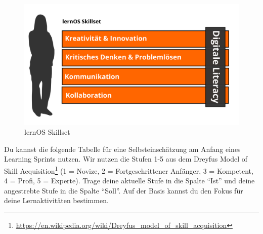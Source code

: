 \documentclass[
  ngerman,
  paper=a4,
,captions=tableheading
]{scrartcl}
\DeclareRobustCommand{\href}[2]{#2\footnote{\url{#1}}}
\begin{document}
\begin{figure}
\centering
\includegraphics{./tex2pdf.-c0ed5a8631023970/0b6da1ca1544dc3dc47d47c304963015ed6dcf34.png}
\caption{lernOS Skillset}
\end{figure}

Du kannst die folgende Tabelle für eine Selbsteinschätzung am Anfang
eines Learning Sprints nutzen. Wir nutzen die Stufen 1-5 aus dem
\href{https://en.wikipedia.org/wiki/Dreyfus_model_of_skill_acquisition}{Dreyfus
Model of Skill Acquisition} (1 = Novize, 2 = Fortgeschrittener Anfänger,
3 = Kompetent, 4 = Profi, 5 = Experte). Trage deine aktuelle Stufe in
die Spalte ``Ist'' und deine angestrebte Stufe in die Spalte ``Soll''.
Auf der Basis kannst du den Fokus für deine Lernaktivitäten bestimmen.
\end{document}
